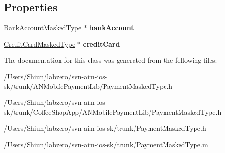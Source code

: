 \subsection*{Properties}
\begin{DoxyCompactItemize}
\item 
\hypertarget{interface_payment_masked_type_a673d323fcae7d2e0132ab504f9e3ba5d}{
\hyperlink{interface_bank_account_masked_type}{BankAccountMaskedType} $\ast$ {\bfseries bankAccount}}
\label{interface_payment_masked_type_a673d323fcae7d2e0132ab504f9e3ba5d}

\item 
\hypertarget{interface_payment_masked_type_af9cb7268ef5e0bf905c6156c86c0f0e3}{
\hyperlink{interface_credit_card_masked_type}{CreditCardMaskedType} $\ast$ {\bfseries creditCard}}
\label{interface_payment_masked_type_af9cb7268ef5e0bf905c6156c86c0f0e3}

\end{DoxyCompactItemize}


The documentation for this class was generated from the following files:\begin{DoxyCompactItemize}
\item 
/Users/Shiun/labzero/svn-\/aim-\/ios-\/sk/trunk/ANMobilePaymentLib/PaymentMaskedType.h\item 
/Users/Shiun/labzero/svn-\/aim-\/ios-\/sk/trunk/CoffeeShopApp/ANMobilePaymentLib/PaymentMaskedType.h\item 
/Users/Shiun/labzero/svn-\/aim-\/ios-\/sk/trunk/PaymentMaskedType.h\item 
/Users/Shiun/labzero/svn-\/aim-\/ios-\/sk/trunk/PaymentMaskedType.m\end{DoxyCompactItemize}
